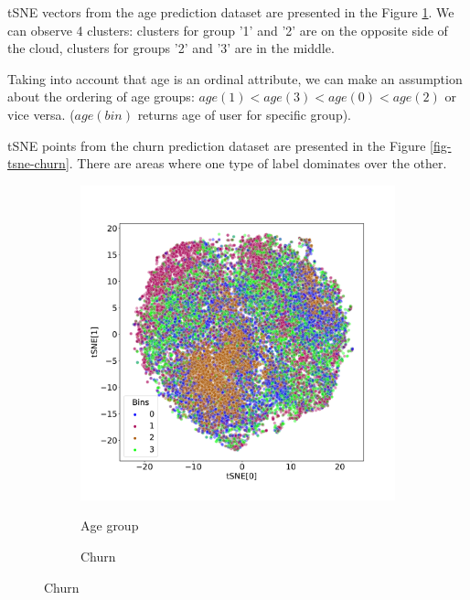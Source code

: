 \documentclass{article}
\begin{document}
tSNE vectors from the age prediction dataset are presented in the Figure \ref{fig-tsne-age2}. We can observe 4 clusters: clusters for group '1' and '2' are on the opposite side of the cloud, clusters for groups '2' and '3' are in the middle.

Taking into account that age is an ordinal attribute, we can make an assumption about the ordering of age groups: $age(1) < age(3) < age(0) < age(2)$ or vice versa. ($age(bin)$ returns age of user for specific group).

tSNE points from the churn prediction dataset are presented in the Figure \ref{fig-tsne-churn}. There are areas where one type of label dominates over the other.

\begin{figure}
  \centering
  \caption{2D tSNE mapping of CoLES embeddings colored by target labels}
  \begin{subfigure}{0.5\textwidth}
    \caption{Age group}
    \includegraphics[width=\textwidth]{figures/iclr-age-pred-tsne.pdf}
    \label{fig-tsne-age2}
  \end{subfigure}%
  \begin{subfigure}{0.5\textwidth}
    \caption{Churn}

\end{subfigure}
\end{figure}
\end{document}
